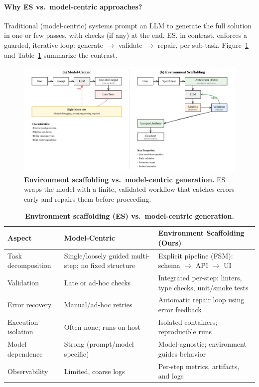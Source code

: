 \documentclass{article}
\begin{document}
\paragraph{Why ES vs.\ model-centric approaches?}
Traditional (model-centric) systems prompt an LLM to generate the full solution in one or few passes, with checks (if any) at the end. ES, in contrast, enforces a guarded, iterative loop: generate $\rightarrow$ validate $\rightarrow$ repair, per sub-task. Figure~\ref{fig:es-vs-model} and Table~\ref{tab:es-contrast} summarize the contrast.

\begin{figure}[t]
  \centering
  \includegraphics[width=\linewidth]{diagrams/es-vs-model.png}
  \vspace{-0.5em}
  \caption{\textbf{Environment scaffolding vs.\ model-centric generation.} ES wraps the model with a finite, validated workflow that catches errors early and repairs them before proceeding.}
  \label{fig:es-vs-model}
\end{figure}

\begin{table}[t]
\centering
\small
\begin{threeparttable}
\caption{\textbf{Environment scaffolding (ES) vs.\ model-centric generation.}}
\label{tab:es-contrast}
\begin{tabular}{@{}p{3.2cm}p{5.6cm}p{5.6cm}@{}}
\toprule
\textbf{Aspect} & \textbf{Model-Centric} & \textbf{Environment Scaffolding (Ours)} \\
\midrule
Task decomposition & Single/loosely guided multi-step; no fixed structure &
Explicit pipeline (FSM): schema $\rightarrow$ API $\rightarrow$ UI \\
Validation & Late or ad-hoc checks &
Integrated per-step: linters, type checks, unit/smoke tests \\
Error recovery & Manual/ad-hoc retries &
Automatic repair loop using error feedback \\
Execution isolation & Often none; runs on host &
Isolated containers; reproducible runs \\
Model dependence & Strong (prompt/model specific) &
Model-agnostic; environment guides behavior \\
Observability & Limited, coarse logs &
Per-step metrics, artifacts, and logs \\
\bottomrule
\end{tabular}
\end{threeparttable}
\end{table}
\end{document}
